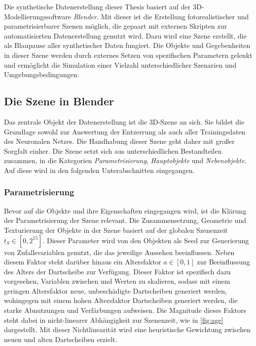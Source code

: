 Die synthetische Datenerstellung dieser Thesis basiert auf der 3D-Modellierungssoftware \textit{Blender}\cite{blender}. Mit dieser ist die Erstellung fotorealistischer und parametrisierbarer Szenen möglich, die gepaart mit externen Skripten zur automatisierten Datenerstellung genutzt wird. Dazu wird eine Szene erstellt, die als Blaupause aller synthetischer Daten fungiert. Die Objekte und Gegebenheiten in dieser Szene werden durch externes Setzen von spezifischen Parametern gelenkt und ermöglicht die Simulation einer Vielzahl unterschiedlicher Szenarien und Umgebungsbedingungen.

\subsection{Die Szene in Blender}
\label{sec:impl:daten:blender}

Das zentrale Objekt der Datenerstellung ist die 3D-Szene an sich. Sie bildet die Grundlage sowohl zur Auswertung der Entzerrung als auch aller Trainingsdaten des Neuronalen Netzes. Die Handhabung dieser Szene geht daher mit großer Sorgfalt einher. Die Szene setzt sich aus unterschiedlichen Bestandteilen zusammen, in die Kategorien \textit{Parametrisierung}, \textit{Hauptobjekte} und \textit{Nebenobjekte}. Auf diese wird in den folgenden Unterabschnitten eingegangen.


\subsubsection{Parametrisierung}
\label{sec:impl:daten:blender:parameter}

Bevor auf die Objekte und ihre Eigenschaften eingegangen wird, ist die Klärung der Parametrisierung der Szene relevant. Die Zusammensetzung, Geometrie und Texturierung der Objekte in der Szene basiert auf der globalen Szenenzeit $t_S \in [0, 2^{15}]$. Dieser Parameter wird von den Objekten als Seed zur Generierung von Zufallsvariablen genutzt, die das jeweilige Aussehen beeinflussen. Neben diesem Faktor steht darüber hinaus ein Altersfaktor $a \in [0, 1]$ zur Beeinflussung des Alters der Dartscheibe zur Verfügung. Dieser Faktor ist spezifisch dazu vorgesehen, Variablen zwischen  und  Werten zu skalieren, sodass mit einem geringen Altersfaktor neue, unbeschädigte Dartscheiben generiert werden, wohingegen mit einem hohen Altersfaktor Dartscheiben generiert werden, die starke Abnutzungen und Verfärbungen aufweisen. Die Magnitude dieses Faktors steht dabei in nicht-linearer Abhängigkeit zur Szenenzeit, wie in \autoref{fig:age} dargestellt. Mit dieser Nichtlinearität wird eine heuristische Gewichtung zwischen neuen und alten Dartscheiben erzielt.

